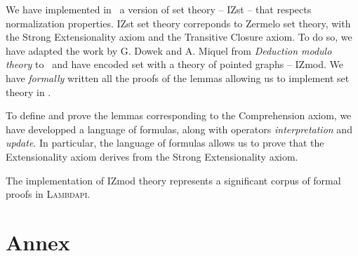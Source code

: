 \documentclass[a4paper]{article}
\begin{document}
We have implemented in \dedukti ~a version of set theory -- IZst -- that respects normalization properties. IZst set theory correponds to Zermelo set theory, with the Strong Extensionality axiom and the Transitive Closure axiom. To do so, we have adapted the work by G. Dowek and A. Miquel \cite{zermodulo} from \textit{Deduction modulo theory} to \lpcm ~and have encoded set with a theory of pointed graphs -- IZmod. We have \textit{formally} written all the proofs of the lemmas allowing us to implement set theory in \dedukti.


To define and prove the lemmas corresponding to the Comprehension axiom, we have developped a language of formulas, along with operators \textit{interpretation} and \textit{update}. In particular, the language of formulas allows us to prove that the Extensionality axiom derives from the Strong Extensionality axiom.

The implementation of IZmod theory represents a significant corpus of formal proofs in \textsc{Lambdapi}.

\newpage
\section*{Annex}
\end{document}
